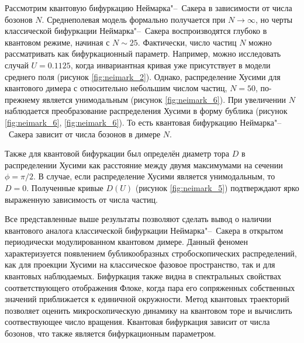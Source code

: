 Рассмотрим квантовую бифуркацию Неймарка"--~Сакера в зависимости от числа бозонов $N$.
Среднеполевая модель формально получается при $N \to \infty$, но черты классической бифуркации Неймарка"--~Сакера воспроизводятся глубоко в квантовом режиме, начиная с $N \sim 25$.
Фактически, число частиц $N$ можно рассматривать как бифуркационный параметр.
Например, можно исследовать случай $U=0.1125$, когда инвариантная кривая уже присутствует в модели среднего поля (рисунок \cref{fig:neimark_2}). 
Однако, распределение Хусими для квантового димера с относительно небольшим числом частиц, $N=50 $, по-прежнему является унимодальным (рисунок \cref{fig:neimark_6}).
При увеличении $N$ наблюдается преобразование распределения Хусими в форму бублика (рисунок \cref{fig:neimark_6}, \cref{fig:neimark_6}).
То есть квантовая бифуркацию Неймарка"--~Сакера зависит от числа бозонов в димере $N$.

Также для квантовой бифуркации был определён диаметр тора $D$ в распределении Хусими как расстояние между двумя максимумами на сечении $\phi = \pi / 2$.
В случае, если распределение Хусими является унимодальным, то $D = 0$. 
Полученные кривые $D(U)$ (рисунок \cref{fig:neimark_5}) подтверждают ярко выраженную зависимость от числа частиц.

Все представленные выше результаты позволяют сделать вывод о наличии квантового аналога классической бифуркации Неймарка"--~Сакера в открытом периодически модулированном квантовом димере.
Данный феномен характеризуется появлением бубликообразных стробоскопических распределений, как для проекции Хусими на классическое фазовое пространство, так и для квантовых наблюдаемых.
Бифуркация также видна в спектральных свойствах соответствующего отображения Флоке, когда пара его сопряженных собственных значений приближается к единичной окружности.
Метод квантовых траекторий позволяет оценить микроскопическую динамику на квантовом торе и вычислить соотвествующее число вращения.
Квантовая бифуркация зависит от числа бозонов, что также является бифуркационным параметром.


